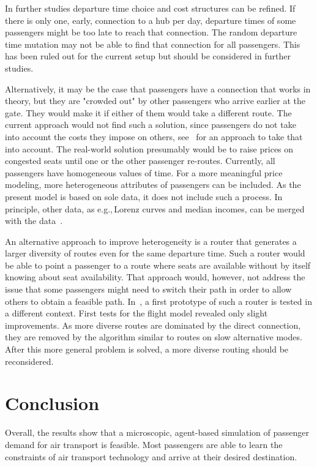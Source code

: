 In further studies departure time choice and cost structures can be refined. 
If there is only one, early, connection to a hub per day, departure times of some passengers might be too late to reach that connection. 
The random departure time mutation may not be able to find that connection for all passengers. 
This has been ruled out for the current setup but should be considered in further studies. 

Alternatively, it may be the case that passengers have a connection that works in theory, but they are "crowded out" by other passengers who arrive earlier at the gate.  
They would make it if either of them would take a different route.  
The current approach would not find such a solution, since passengers do not take into account the costs they impose on others, see~\citet{LaemmelFloetteroed2009KISysOptEvac} for an approach to take that into account.  
The real-world solution presumably would be to raise prices on congested seats until one or the other passenger re-routes. 
Currently, all passengers have homogeneous values of time.   
For a more meaningful price modeling, more heterogeneous attributes of passengers can be included. 
As the present model is based on sole  data, it does not include such a process. 
In principle, other data, as e.g.,\,Lorenz curves and median incomes, can be merged with the  data~\citep{KickhoeferEtAl2011PolicyEvaluationIncome}.  

An alternative approach to improve heterogeneity is a router that generates a larger diversity of routes even for the same departure time.  
Such a router would be able to point a passenger to a route where seats are available without by itself knowing about seat availability.  
That approach would, however, not address the issue that some passengers might need to switch their path in order to allow others to obtain a feasible path. 
In~\citet{Graf2013Da}, a first prototype of such a router is tested in a different context. 
First tests for the flight model revealed only slight improvements. 
As more diverse routes are dominated by the direct connection, they are removed by the algorithm similar to routes on slow alternative modes. 
After this more general problem is solved, a more diverse routing should be reconsidered. 

\section{Conclusion}
Overall, the results show that a microscopic, agent-based simulation of passenger demand for air transport is feasible. 
Most passengers are able to learn the constraints of air transport technology and arrive at their desired destination.

